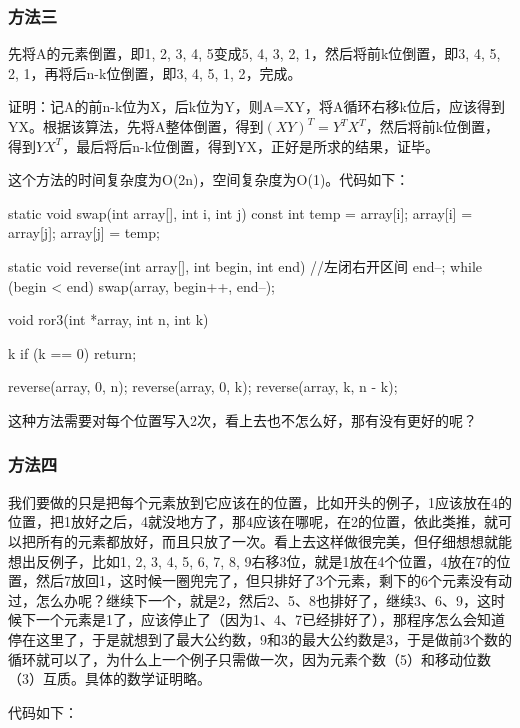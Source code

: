 \subsubsection{方法三}
先将A的元素倒置，即{1, 2, 3, 4, 5}变成{5, 4, 3, 2, 1}，然后将前k位倒置，即{3, 4, 5, 2, 1}，再将后n-k位倒置，即{3, 4, 5, 1, 2}，完成。

证明：记A的前n-k位为X，后k位为Y，则A=XY，将A循环右移k位后，应该得到YX。根据该算法，先将A整体倒置，得到$(XY)^T=Y^TX^T$，然后将前k位倒置，得到$YX^T$，最后将后n-k位倒置，得到YX，正好是所求的结果，证毕。

这个方法的时间复杂度为O(2n)，空间复杂度为O(1)。代码如下：

\begin{Codex}[label=ror.c]
static void swap(int array[], int i, int j) {
    const int temp = array[i];
    array[i] = array[j];
    array[j] = temp;
}

static void reverse(int array[], int begin, int end) { //左闭右开区间
    end--;
    while (begin < end)
        swap(array, begin++, end--);
}

void ror3(int *array, int n, int k) {
    k %
    if (k == 0)
        return;

    reverse(array, 0, n);
    reverse(array, 0, k);
    reverse(array, k, n - k);
}
\end{Codex}

这种方法需要对每个位置写入2次，看上去也不怎么好，那有没有更好的呢？

\subsubsection{方法四}
我们要做的只是把每个元素放到它应该在的位置，比如开头的例子，1应该放在4的位置，把1放好之后，4就没地方了，那4应该在哪呢，在2的位置，依此类推，就可以把所有的元素都放好，而且只放了一次。看上去这样做很完美，但仔细想想就能想出反例子，比如{1, 2, 3, 4, 5, 6, 7, 8, 9}右移3位，就是1放在4个位置，4放在7的位置，然后7放回1，这时候一圈兜完了，但只排好了3个元素，剩下的6个元素没有动过，怎么办呢？继续下一个，就是2，然后2、5、8也排好了，继续3、6、9，这时候下一个元素是1了，应该停止了（因为1、4、7已经排好了），那程序怎么会知道停在这里了，于是就想到了最大公约数，9和3的最大公约数是3，于是做前3个数的循环就可以了，为什么上一个例子只需做一次，因为元素个数（5）和移动位数（3）互质。具体的数学证明略。

代码如下：

